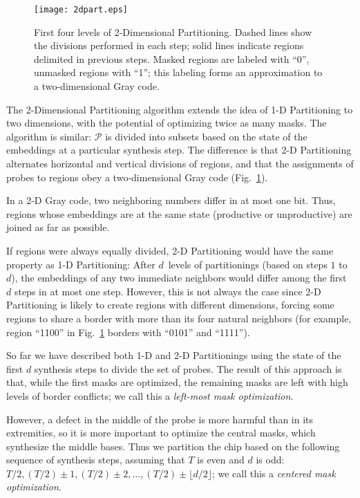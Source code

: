 \begin{figure}\centering
\texttt{[image: 2dpart.eps]}
\caption{\label{fig:2dpart}%
  First four levels of 2-Dimensional Partitioning. Dashed lines show
  the divisions performed in each step; solid lines indicate regions
  delimited in previous steps. Masked regions are labeled with ``0'',
  unmasked regions with ``1''; this labeling forms an approximation to
  a two-dimensional Gray code.}%
\end{figure}

The 2-Dimensional Partitioning algorithm extends the idea of 1-D
Partitioning to two dimensions, with the potential of optimizing twice
as many masks. The algorithm is similar: $\mathcal{P}$ is divided into
subsets based on the state of the embeddings at a particular
synthesis step. The difference is that 2-D Partitioning alternates
horizontal and vertical divisions of regions, and that the assignments
of probes to regions obey a two-dimensional Gray code
(Fig.~\ref{fig:2dpart}).

In a 2-D Gray code, two neighboring numbers differ in at most one
bit.  Thus, regions whose embeddings are at the same state (productive or
unproductive) are joined as far as possible.

If regions were always equally divided, 2-D Partitioning would have
the same property as 1-D Partitioning: After $d$~levels of
partitionings (based on steps $1$ to $d$), the embeddings of any two
immediate neighbors would differ among the first $d$ steps in at most
one step. However, this is not always the case since 2-D Partitioning
is likely to create regions with different dimensions, forcing some
regions to share a border with more than its four natural neighbors
(for example, region ``1100'' in Fig.~\ref{fig:2dpart} borders with
``0101'' and ``1111'').

So far we have described both 1-D and 2-D Partitionings using the
state of the first $d$ synthesis steps to divide the set of probes.
The result of this approach is that, while the first masks are
optimized, the remaining masks are left with high levels of border
conflicts; we call this a \emph{left-most mask optimization}.

However, a defect in the middle of the probe is more harmful than in
its extremities, so it is more important to optimize the central masks,
which synthesize the middle bases. Thus we
partition the chip based on the following sequence
of synthesis steps, assuming that $T$ is even and $d$ is odd: $T/2,
(T/2)\pm 1, (T/2)\pm 2, \dots, (T/2)\pm\lfloor d/2\rfloor$; we call
this a \emph{centered mask optimization}.

